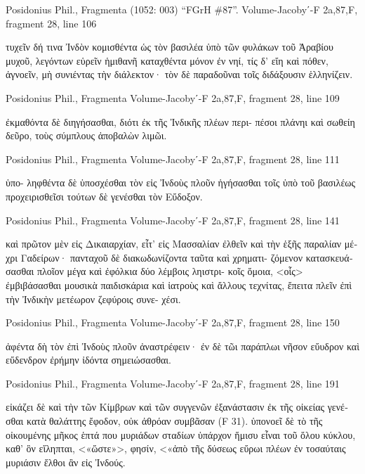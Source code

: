 \documentclass[12pt,letterpaper,twoside,final]{memoir}
\begin{document}
\begin{greek}
Posidonius Phil., Fragmenta (1052: 003)
“FGrH \#87”.
Volume-Jacobyʹ-F 2a,87,F, fragment 28, line 106

                                                               τυχεῖν δή τινα 
Ἰνδὸν κομισθέντα ὡς τὸν βασιλέα ὑπὸ τῶν φυλάκων τοῦ Ἀραβίου μυχοῦ, 
λεγόντων εὑρεῖν ἡμιθανῆ καταχθέντα μόνον ἐν νηί, τίς δ' εἴη καὶ πόθεν, 
ἀγνοεῖν, μὴ συνιέντας τὴν διάλεκτον· τὸν δὲ παραδοῦναι τοῖς διδάξουσιν 
ἑλληνίζειν. 



Posidonius Phil., Fragmenta 
Volume-Jacobyʹ-F 2a,87,F, fragment 28, line 109

              ἐκμαθόντα δὲ διηγήσασθαι, διότι ἐκ τῆς Ἰνδικῆς πλέων περι-
πέσοι πλάνηι καὶ σωθείη δεῦρο, τοὺς σύμπλους ἀποβαλὼν λιμῶι. 



Posidonius Phil., Fragmenta 
Volume-Jacobyʹ-F 2a,87,F, fragment 28, line 111

                                                                       ὑπο-
ληφθέντα δὲ ὑποσχέσθαι τὸν εἰς Ἰνδοὺς πλοῦν ἡγήσασθαι τοῖς ὑπὸ τοῦ 
βασιλέως προχειρισθεῖσι τούτων δὲ γενέσθαι τὸν Εὔδοξον. 



Posidonius Phil., Fragmenta 
Volume-Jacobyʹ-F 2a,87,F, fragment 28, line 141

καὶ πρῶτον μὲν εἰς Δικαιαρχίαν, εἶτ' εἰς Μασσαλίαν ἐλθεῖν καὶ τὴν ἑξῆς 
παραλίαν μέχρι Γαδείρων· πανταχοῦ δὲ διακωδωνίζοντα ταῦτα καὶ χρηματι-
ζόμενον κατασκευάσασθαι πλοῖον μέγα καὶ ἐφόλκια δύο λέμβοις ληιστρι-
κοῖς ὅμοια, <οἷς> ἐμβιβάσασθαι μουσικὰ παιδισκάρια καὶ ἰατροὺς καὶ 
ἄλλους τεχνίτας, ἔπειτα πλεῖν ἐπὶ τὴν Ἰνδικὴν μετέωρον ζεφύροις συνε-
χέσι. 



Posidonius Phil., Fragmenta 
Volume-Jacobyʹ-F 2a,87,F, fragment 28, line 150

ἀφέντα δὴ τὸν ἐπὶ Ἰνδοὺς πλοῦν ἀναστρέφειν· ἐν δὲ τῶι παράπλωι νῆσον 
εὔυδρον καὶ εὔδενδρον ἐρήμην ἰδόντα σημειώσασθαι. 



Posidonius Phil., Fragmenta 
Volume-Jacobyʹ-F 2a,87,F, fragment 28, line 191

εἰκάζει δὲ καὶ τὴν τῶν Κίμβρων καὶ τῶν συγγενῶν ἐξανάστασιν ἐκ 
τῆς οἰκείας γενέσθαι κατὰ θαλάττης ἔφοδον, οὐκ ἀθρόαν συμβᾶσαν (F 31). 
 ὑπονοεῖ δὲ τὸ τῆς οἰκουμένης μῆκος ἑπτά που μυριάδων σταδίων 
ὑπάρχον ἥμισυ εἶναι τοῦ ὅλου κύκλου, καθ' ὃν εἴληπται, <«ὥστε»>, φησίν, 
<«ἀπὸ τῆς δύσεως εὔρωι πλέων ἐν τοσαύταις μυριάσιν 
ἔλθοι ἂν εἰς Ἰνδούς. 




\end{greek}
\end{document}
